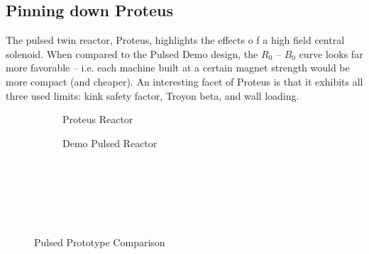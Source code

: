 \begin{table}[h!]
\begin{subtable}[t]{0.5\textwidth}
\begin{tabular}{ c|c }
\end{tabular}
\end{subtable}
\hfill
\hfill
\end{table}

\newpage 

\subsection{Pinning down Proteus}

The pulsed twin reactor, Proteus, highlights the effects o f a high field central solenoid. When compared to the Pulsed Demo design, the $R_0$ -- $B_0$ curve looks far more favorable -- i.e. each machine built at a certain magnet strength would be more compact (and cheaper). An interesting facet of Proteus is that it exhibits all three used limits: kink safety factor, Troyon beta, and wall loading.

\begin{figure*}[h!]
    \centering
    \hfill 
    \begin{subfigure}[t]{0.45\textwidth}
        \centering
    \begin{adjustbox}{width=\textwidth}
      \Large
      
    \end{adjustbox}
        \caption{Proteus Reactor}
    \end{subfigure}
    \hfill
    \begin{subfigure}[t]{0.45\textwidth}
        \centering
    \begin{adjustbox}{width=\textwidth}
      \Large
      
    \end{adjustbox}
        \caption{Demo Pulsed Reactor}
    \end{subfigure}
    \hfill \hfill ~\\ ~\\ ~\\
    \caption{Pulsed Prototype Comparison} ~\\
\end{figure*}

